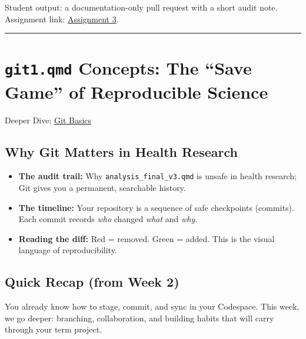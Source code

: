 \documentclass[
  letterpaper,
  DIV=11,
  numbers=noendperiod,
  oneside]{scrreprt}
\providecommand{\tightlist}{%
  \setlength{\itemsep}{0pt}\setlength{\parskip}{0pt}}
\begin{document}
Student output: a documentation-only pull request with a short audit
note. Assignment link:
\href{../../assignments/assignment03-git/README.md}{Assignment 3}.

\begin{center}\rule{0.5\linewidth}{0.5pt}\end{center}

\section*{\texorpdfstring{\texttt{git1.qmd} Concepts: The ``Save Game''
of Reproducible
Science}{git1.qmd Concepts: The ``Save Game'' of Reproducible Science}}\label{git1.qmd-concepts-the-save-game-of-reproducible-science}


Deeper Dive: \href{git01-concepts.qmd}{Git Basics}

\subsection*{Why Git Matters in Health
Research}\label{why-git-matters-in-health-research}

\begin{itemize}
\tightlist
\item
  \textbf{The audit trail:} Why \texttt{analysis\_final\_v3.qmd} is
  unsafe in health research; Git gives you a permanent, searchable
  history.
\item
  \textbf{The timeline:} Your repository is a sequence of safe
  checkpoints (commits). Each commit records \emph{who} changed
  \emph{what} and \emph{why}.
\item
  \textbf{Reading the diff:} Red = removed. Green = added. This is the
  visual language of reproducibility.
\end{itemize}

\subsection*{Quick Recap (from Week 2)}\label{quick-recap-from-week-2}

You already know how to stage, commit, and sync in your Codespace. This
week, we go deeper: branching, collaboration, and building habits that
will carry through your term project.
\end{document}
